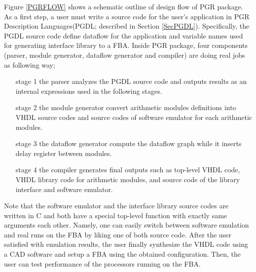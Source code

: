 \documentclass{article}
\begin{document}
Figure \ref{PGRFLOW} shows a schematic outline of design flow of PGR package.
As a first step, a user must write a source code for the user's application
in PGR Description Languages(PGDL; described in Section \ref{SecPGDL}).
Specifically, the PGDL source code define dataflow for the application
and variable names used for generating interface library to a FBA.
Inside PGR package, four components (parser, module generator, dataflow
generator and compiler)
are doing real jobs as following way;
\begin{itemize}
\item[stage 1] the parser analyzes the PGDL source code and outputs results
as an internal expressions used in the following stages.
\item[stage 2] the module generator convert arithmetic modules definitions
into VHDL source codes and source codes of software emulator for each
arithmetic modules.
\item[stage 3] the dataflow generator compute the dataflow graph
while it inserts delay register between modules.
\item[stage 4] the compiler generates final outputs such as
top-level VHDL code, VHDL library code for arithmetic modules,
and source code of the library interface and software emulator.
\end{itemize}
Note that the software emulator and the interface library
source codes are written in C and both have a special top-level function
with exactly same arguments each other.
Namely, one can easily switch between software emulation
and real runs on the FBA by liking one of both source code.
After the user satisfied with emulation results, the user finally synthesize
the VHDL code using a CAD software and setup a FBA using the obtained
configuration.
Then, the user can test performance of the processors running on the FBA.


\end{document}
